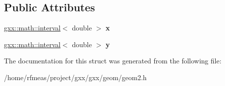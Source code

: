 \subsection*{Public Attributes}
\begin{DoxyCompactItemize}
\item 
\hyperlink{classgxx_1_1math_1_1interval}{gxx\+::math\+::interval}$<$ double $>$ {\bfseries x}\hypertarget{structgxx_1_1geom2_1_1boundbox_ae431a779a4fd01ea6f154287b242e01c}{}\label{structgxx_1_1geom2_1_1boundbox_ae431a779a4fd01ea6f154287b242e01c}

\item 
\hyperlink{classgxx_1_1math_1_1interval}{gxx\+::math\+::interval}$<$ double $>$ {\bfseries y}\hypertarget{structgxx_1_1geom2_1_1boundbox_a260fb71bc68508e5148b32b196e656dc}{}\label{structgxx_1_1geom2_1_1boundbox_a260fb71bc68508e5148b32b196e656dc}

\end{DoxyCompactItemize}


The documentation for this struct was generated from the following file\+:\begin{DoxyCompactItemize}
\item 
/home/rfmeas/project/gxx/gxx/geom/geom2.\+h\end{DoxyCompactItemize}
